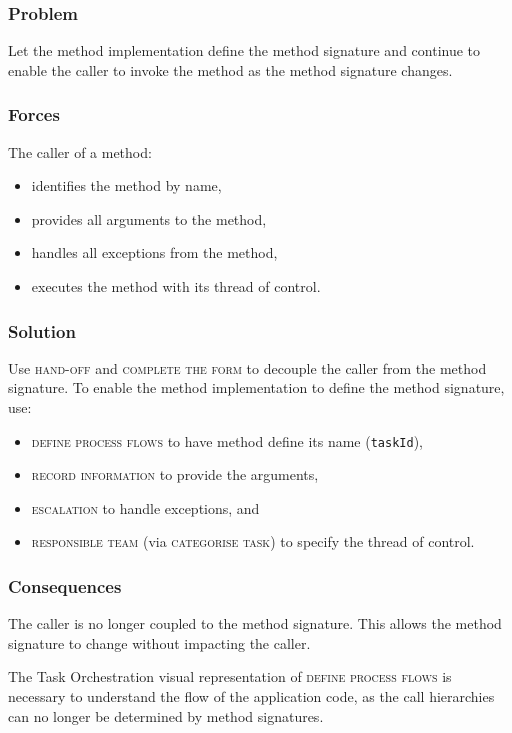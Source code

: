 \documentclass[prodmode]{style/acmlarge}
\begin{document}
\subsubsection*{Problem} Let the method implementation define the method
signature and continue to enable the caller to invoke the method as the method
signature changes.

\subsubsection*{Forces} The caller of a method:
\begin{itemize}
  \item identifies the method by name,
  \item provides all arguments to the method,
  \item handles all exceptions from the method,
  \item executes the method with its thread of control.
\end{itemize}

\subsubsection*{Solution} Use \textsc{hand-off} and \textsc{complete the form}
to decouple the caller from the method signature.  To enable the method
implementation to define the method signature, use:
\begin{itemize}
  \item \textsc{define process flows} to have method define its name (\texttt{taskId}),
  \item \textsc{record information} to provide the arguments,
  \item \textsc{escalation} to handle exceptions, and
  \item \textsc{responsible team} (via \textsc{categorise task}) to specify the thread of control.    
\end{itemize}

\subsubsection*{Consequences} The caller is no longer coupled to the method
signature.  This allows the method signature to change without impacting the
caller.

The Task Orchestration visual representation of \textsc{define process flows} is
necessary to understand the flow of the application code, as the call
hierarchies can no longer be determined by method signatures.
\end{document}
